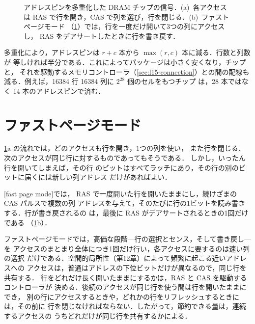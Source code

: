 \documentclass[../main.tex]{subfiles}
\begin{document}
\begin{figure}[htbp]
  \centering
  
  \caption{アドレスピンを多重化した DRAM チップの信号．(a)~各アクセスは
    RAS で行を開き，CAS で列を選び，行を閉じる．(b)~ファストページモード
    （\cref{sec:l15-fpm}）では，行を一度だけ開いて3つの列にアクセスし，
    RAS をデアサートしたときに行を書き戻す．}
  \label{fig:l15-timing}
\end{figure}

多重化により，アドレスピンは $r+c$ 本から $\max(r,c)$ 本に減る．行数と列数が
等しければ半分である．これによってパッケージは小さく安くなり，チップと，
それを駆動するメモリコントローラ（\cref{sec:l15-connection}）との間の配線も
減る．例えば，\num{16384} 行 \num{16384} 列に $2^{28}$ 個のセルをもつチップ
は，28 本ではなく 14 本のアドレスピンで済む．

\section{ファストページモード}
\label{sec:l15-fpm}

\cref{fig:l15-timing}a の流れでは，どのアクセスも行を開き，1つの列を使い，
また行を閉じる．次のアクセスが同じ行に対するものであってもそうである．
しかし，いったん行を開いてしまえば，その行
のビットはすべてラッチにあり，その行の別のビットに届くには新しい列アドレス
だけがあればよい．

\begin{definition}[ファストページモード]
  [fast page mode]では，
  RAS で一度開いた行を開いたままにし，続けざまの CAS パルスで複数の列
  アドレスを与えて，そのたびに行の1ビットを読み書きする．行が書き戻されるの
  は，最後に RAS がデアサートされるときの1回だけである
  （\cref{fig:l15-timing}b）．
\end{definition}


ファストページモードでは，高価な段階---行の選択とセンス，そして書き戻し---を
アクセスのまとまり全体につき1回だけ行い，各アクセスに要するのは速い列の選択
だけである．空間的局所性（第12章）によって頻繁に起こる近いアドレスへの
アクセスは，普通はアドレスの下位ビットだけが異なるので，同じ行を共有する．
行をどれだけ長く開いたままにするかは，RAS と CAS を駆動するコントローラが
決める．後続のアクセスが同じ行を使う間は行を開いたままにでき，
別の行にアクセスするときや，どれかの行をリフレッシュするときには，その前に
行を閉じなければならない．したがって，節約できる量は，連続するアクセスの
うちどれだけが同じ行を共有するかによる．
\end{document}
